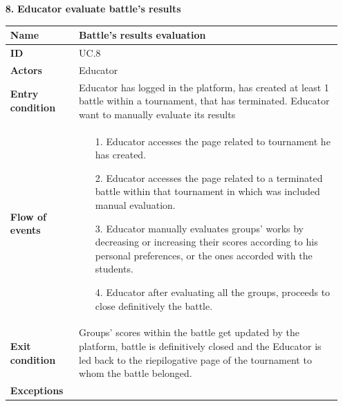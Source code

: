 \documentclass{article}
\begin{document}
{\begin{enumerate}
    \item[\textbf{8.}] \textbf{Educator evaluate battle's results}
          \begin{xltabular}{\textwidth}
              {| >{\raggedright\arraybackslash}g | >{\raggedright\arraybackslash}X |}
              \hline
              \endfirsthead
              \hline
              \endhead
              \endfoot
              \hline
              \endlastfoot




              \textbf{Name} & Battle's results evaluation\\
              \hline
              \textbf{ID} & UC.8\\
              \hline
              \textbf{Actors} & Educator\\
              \hline
              \textbf{Entry condition} & Educator has logged in the platform, has created at least 1 battle
              within a tournament, that has terminated. Educator want to manually evaluate its results\\
              \hline
              \textbf{Flow of events} &    \begin{enumerate}
                  \item[1.] Educator accesses the page related to tournament
                        he has created.
                  \item[2.] Educator accesses the page related to a terminated
                        battle within that tournament in which was included manual
                        evaluation.
                  \item[3.] Educator manually evaluates groups' works by decreasing or
                        increasing their scores according to his personal preferences, or
                        the ones accorded with the students.
                  \item[4.] Educator after evaluating all the groups, proceeds to
                        close definitively the battle.
              \end{enumerate} \\
              \hline
              \textbf{Exit condition} & Groups' scores within the battle get updated by the platform,
              battle is definitively closed and the Educator is led back to the riepilogative page of
              the tournament to whom the battle belonged.\\
              \hline
              \textbf{Exceptions} &    \begin{itemize}

\end{itemize}
\end{xltabular}
\end{enumerate}}
\end{document}
